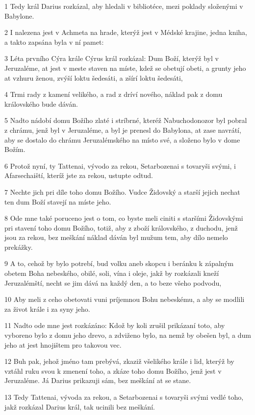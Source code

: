 \par 1 Tedy král Darius rozkázal, aby hledali v bibliotéce, mezi poklady složenými v Babylone.
\par 2 I nalezena jest v Achmeta na hrade, kterýž jest v Médské krajine, jedna kniha, a takto zapsána byla v ní pamet:
\par 3 Léta prvního Cýra krále Cýrus král rozkázal: Dum Boží, kterýž byl v Jeruzaléme, at jest v meste staven na míste, kdež se obetují obeti, a grunty jeho at vzhuru ženou, zvýší loktu šedesáti, a zšírí loktu šedesáti,
\par 4 Trmi rady z kamení velikého, a rad z dríví nového, náklad pak z domu královského bude dáván.
\par 5 Nadto nádobí domu Božího zlaté i stríbrné, kteréž Nabuchodonozor byl pobral z chrámu, jenž byl v Jeruzaléme, a byl je prenesl do Babylona, at zase navrátí, aby se dostalo do chrámu Jeruzalémského na místo své, a složeno bylo v dome Božím.
\par 6 Protož nyní, ty Tattenai, vývodo za rekou, Setarbozenai s tovaryši svými, i Afarsechaiští, kteríž jste za rekou, ustupte odtud.
\par 7 Nechte jich pri díle toho domu Božího. Vudce Židovský a starší jejich nechat ten dum Boží stavejí na míste jeho.
\par 8 Ode mne také poruceno jest o tom, co byste meli ciniti s staršími Židovskými pri stavení toho domu Božího, totiž, aby z zboží královského, z duchodu, jenž jsou za rekou, bez meškání náklad dáván byl mužum tem, aby dílo nemelo prekážky.
\par 9 A to, cehož by bylo potrebí, bud volku aneb skopcu i beránku k zápalným obetem Boha nebeského, obilé, soli, vína i oleje, jakž by rozkázali kneží Jeruzalémští, necht se jim dává na každý den, a to beze všeho podvodu,
\par 10 Aby meli z ceho obetovati vuni príjemnou Bohu nebeskému, a aby se modlili za život krále i za syny jeho.
\par 11 Nadto ode mne jest rozkázáno: Kdož by koli zrušil prikázaní toto, aby vyboreno bylo z domu jeho drevo, a zdviženo bylo, na nemž by obešen byl, a dum jeho at jest hnojištem pro takovou vec.
\par 12 Buh pak, jehož jméno tam prebývá, zkaziž všelikého krále i lid, kterýž by vztáhl ruku svou k zmenení toho, a zkáze toho domu Božího, jenž jest v Jeruzaléme. Já Darius prikazuji sám, bez meškání at se stane.
\par 13 Tedy Tattenai, vývoda za rekou, a Setarbozenai s tovaryši svými vedlé toho, jakž rozkázal Darius král, tak ucinili bez meškání.
